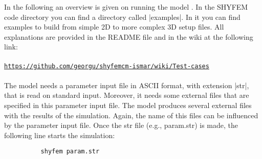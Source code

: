
%
%
%
%
%
%
%

In the following an overview is given on running the model \shy{}. In the SHYFEM code directory you can find a directory called |examples|.  In it you can find examples to build from simple 2D to more complex 3D setup files. All explanations are
provided in the README file and in the wiki at the following
link:
\\
\\
\underline{\texttt{https://github.com/georgu/shyfemcm-ismar/wiki/Test-cases}}
\\
\\
The
model needs a parameter input file in ASCII format, with extension |str|,
that is read on standard input. Moreover, it needs some external files
that are specified in this parameter input file. The model produces
several external files with the results of the simulation. Again, the
name of this files can be influenced by the parameter input file.
Once the str file (e.g., param.str) is made, the following line starts the simulation:

\begin{verbatim}
          shyfem param.str
\end{verbatim}
